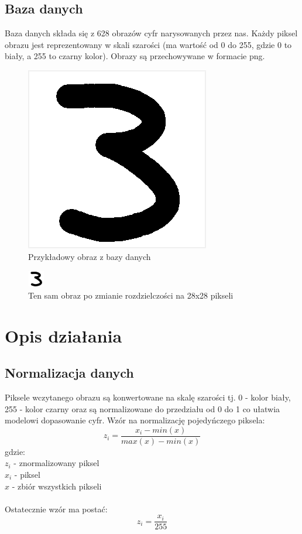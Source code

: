 \documentclass[12pt,a4paper]{article}
\begin{document}
\subsection{Baza danych}
Baza danych składa się z 628 obrazów cyfr narysowanych przez nas. Każdy piksel obrazu jest reprezentowany w skali
szarości (ma wartość od 0 do 255, gdzie 0 to biały, a 255 to czarny kolor). Obrazy są przechowywane w formacie png.
\newpage
\begin{figure}[!h]
	\includegraphics[scale=0.8]{"number_example.png"}
	\centering
	\caption{Przykładowy obraz z bazy danych}
\end{figure}
\begin{figure}[!h]
	\includegraphics[scale=8]{"normalized.png"}
	\centering
	\caption{Ten sam obraz po zmianie rozdzielczości na 28x28 pikseli}
\end{figure}
\newpage
\section{Opis działania}
\subsection{Normalizacja danych}
Piksele wczytanego obrazu są konwertowane na skalę szarości tj. 0 - kolor biały, 255 - kolor czarny
oraz są normalizowane do przedziału od 0 do 1 co ułatwia modelowi dopasowanie cyfr.
Wzór na normalizację pojedyńczego piksela:
\[
	z_i=\frac{x_i - min(x)}{max(x) - min(x)}
\]
gdzie: \\
\indent $z_i$ - znormalizowany piksel\\
\indent $x_i$ - piksel\\
\indent $x$ - zbiór wszystkich pikseli\\~\\
Ostatecznie wzór ma postać:
\[
	z_i=\frac{x_i}{255}
\]
\end{document}

